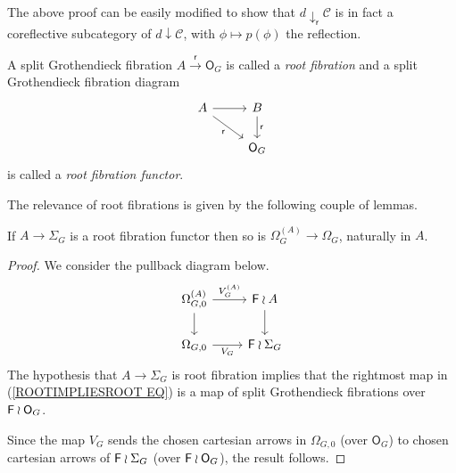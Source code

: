 \documentclass[a4paper,10pt]{article}%
\begin{document}
\begin{remark}
  The above proof can be easily modified to show that $d \downarrow_{\mathsf r} \mathcal C$ is in fact a coreflective subcategory of $d \downarrow \mathcal C$, with $\phi \mapsto p(\phi)$ the reflection.
\end{remark}

\begin{definition}
  A split Grothendieck fibration 
  $A \xrightarrow{\mathsf{r}} \mathsf{O}_G$
  is called a \textit{root fibration} and a split Grothendieck fibration diagram
  \[
  \begin{tikzcd}
    A \ar{r} \ar{rd}[swap]{\mathsf{r}}&
    B \ar{d}{\mathsf{r}} 
    \\
    & \mathsf{O}_G 
  \end{tikzcd}
  \]
  is called a \textit{root fibration functor}.
\end{definition}


The relevance of root fibrations is given by the following couple of lemmas.

\begin{lemma}\label{ROOTFIBPULL LEM}
  If $A \to \Sigma_G$ is a root fibration functor then so is 
  $\Omega_G^{(A)} \to \Omega_G$, naturally in $A$.
\end{lemma}


\begin{proof}
  We consider the pullback diagram below.
  \begin{equation}\label{ROOTIMPLIESROOT EQ}
    \begin{tikzcd}
      \Omega_{G,0}^{(A)} \ar{r}{V_G^{(A)}} \ar{d} &
      \Fin \wr A \ar{d}
      \\
      \Omega_{G,0} \ar{r}[swap]{V_G} &
      \Fin \wr \Sigma_G
    \end{tikzcd}
  \end{equation}
  The hypothesis that $A \to \Sigma_G$ is root fibration 
  implies that the rightmost map in (\ref{ROOTIMPLIESROOT EQ})
  is a map of split Grothendieck fibrations over
  $\mathsf{F} \wr \mathsf{O}_G$.

  Since the map $V_G$ sends the chosen cartesian arrows in $\Omega_{G,0}$
  (over $\mathsf{O}_G$) to chosen cartesian arrows of $\mathsf{F} \wr \Sigma_G$ (over $\mathsf{F} \wr \mathsf{O}_G$), the result follows.
\end{proof}
\end{document}
